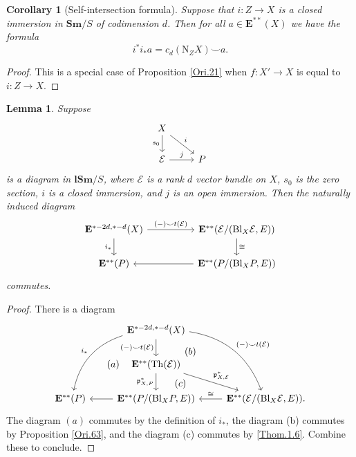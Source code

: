 \documentclass[11pt, a4paper]{amsart}
\newtheorem{lem}[thm]{Lemma}
\newtheorem{cor}[thm]{Corollary}
\theoremstyle{definition}
\numberwithin{equation}{subsection}
\newcommand{\Sm}{\mathbf{Sm}}
\newcommand{\lSm}{\mathbf{lSm}}
\newcommand{\Blow}{{\mathrm{Bl}}}
\newcommand{\Normal}{{\mathrm{N}}}
\newcommand{\Thom}{\mathrm{Th}}
\newcommand{\cE}{\mathcal{E}}
\newcommand{\ringE}{\mathbf{E}}
\begin{document}
\begin{cor}
[Self-intersection formula]
\label{Ori.26}
Suppose that $i\colon Z\to X$ is a closed immersion in $\Sm/S$ of codimension $d$.
Then for all $a\in \ringE^{**}(X)$ we have the formula
\[
i^*i_*a
=
c_d(\Normal_Z X)\smile a.
\]
\end{cor}
\begin{proof}
This is a special case of Proposition \ref{Ori.21} when $f\colon X'\to X$ is equal to $i\colon Z\to X$.
\end{proof}

\begin{lem}
\label{Ori.39}
Suppose
\[
\begin{tikzcd}
X\ar[rd,"i"]\ar[d,"s_0"']
\\
\cE\ar[r,"j"]&
P
\end{tikzcd}
\]
is a diagram in $\lSm/S$, where $\cE$ is a rank $d$ vector bundle on $X$, $s_0$ is the zero section, $i$ is a closed immersion, and $j$ is an open immersion.
Then the naturally induced diagram
\[
\begin{tikzcd}[column sep=huge]
\ringE^{*-2d,*-d}(X)\ar[d,"i_*"']\ar[r,"(-)\smile t(\cE)"]&
\ringE^{**}(\cE/(\Blow_X \cE,E))\ar[d,"\cong"]
\\
\ringE^{**}(P)\ar[r,leftarrow]&
\ringE^{**}(P/(\Blow_X P,E))
\end{tikzcd}
\]
commutes.
\end{lem}
\begin{proof}
There is a diagram
\[
\begin{tikzcd}
&
\ringE^{*-2d,*-d}(X)\ar[d,"(-)\smile t(\cE)"']\ar[rdd,"(-)\smile t(\cE)",bend left]
\ar[ldd,"i_*"',bend right]\ar[ldd,"(a)",phantom]\ar[rdd,"(b)",phantom,near start]
\\
&
\ringE^{**}(\Thom(\cE))\ar[d,"\mathfrak{p}_{X,P}^*"']\ar[rd,"\mathfrak{p}_{X,\cE}^*"]
\ar[rd,"(c)",phantom,bend right=18,near start]
\\
\ringE^{**}(P)\ar[r,leftarrow]&
\ringE^{**}(P/(\Blow_X P,E))\ar[r,"\cong",leftarrow]&
\ringE^{**}(\cE/(\Blow_X \cE,E)).
\end{tikzcd}
\]
The diagram $(a)$ commutes by the definition of $i_*$, the diagram (b) commutes by Proposition \ref{Ori.63}, and the diagram (c) commutes by \eqref{Thom.1.6}.
Combine these to conclude.
\end{proof}
\end{document}
